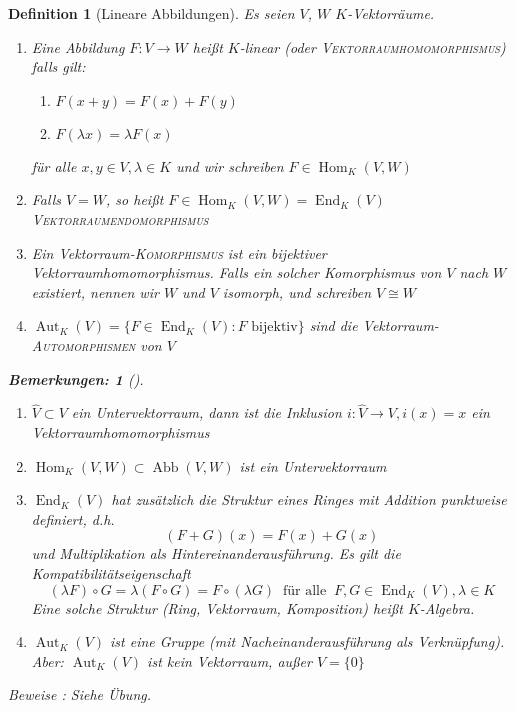 \documentclass{report}
\newcommand{\IN}[1]{\index{#1|BH}}
\newcommand{\lb}{\lambda}
\DeclareMathOperator{\abb}{Abb}
\DeclareMathOperator{\Hom}{Hom}
\DeclareMathOperator{\End}{End}
\DeclareMathOperator{\Aut}{Aut}
\theoremstyle{customrem}
\newtheorem*{bemerkung2}{Bemerkungen\textnormal:}
\newenvironment{bemerkungen}[1][]{\begin{bemerkung2}[#1]\leavevmode}{\end{bemerkung2}}
\theoremstyle{customdef}
\newtheorem{definition}{Definition}[chapter]
\newcommand{\defemph}[1]{\textsc{#1}}
\begin{document}
	\begin{definition}[Lineare Abbildungen]
		\label{def31}
		\IN{Lineare Abbildung}
		Es seien \(V\), \(W\) \(K\)-Vektorräume.
		\begin{enumerate}
			\item Eine Abbildung \(F : V \to W\) heißt \(K\)-linear (oder \defemph{Vektorraumhomomorphismus}) falls gilt:
			\begin{enumerate}[leftmargin=5cm]
				\item \(F(x + y) = F(x) + F(y)\)
				\item \(F(\lb x) = \lb F(x)\)
			\end{enumerate}
			für alle \(x, y \in V, \lb \in K\) und wir schreiben \(F \in \Hom_K(V, W)\)
			
			\item Falls \(V = W\), so heißt \(F \in \Hom_K(V, W) = \End_K(V)\) \defemph{Vektorraumendomorphismus}
			\item Ein Vektorraum-\defemph{Komorphismus} ist ein bijektiver Vektorraumhomomorphismus. Falls ein solcher Komorphismus von \(V\) nach \(W\) existiert, nennen wir \(W\) und \(V\) isomorph, und schreiben \(V \cong W\)
			\item \(\Aut_K(V) = \{F \in \End_K(V) : F \text{ bijektiv}\}\) sind die Vektorraum-\defemph{Automorphismen} von \(V\)
		\end{enumerate}
		\vspace{.1cm}
		\begin{bemerkungen}
			\begin{enumerate}
				\item \(\hat{V} \subset V\) ein Untervektorraum, dann ist die Inklusion \(i : \hat{V} \to V, i(x) = x\) ein Vektorraumhomomorphismus
				\item \(\Hom_K(V, W) \subset \abb(V, W)\) ist ein Untervektorraum
				\item \(\End_K(V)\) hat zusätzlich die Struktur eines Ringes mit Addition punktweise definiert, d.h. \[(F + G)(x) = F(x) + G(x)\] und Multiplikation als Hintereinanderausführung.
				Es gilt die Kompatibilitätseigenschaft
				\[(\lb F) \circ G = \lb (F \circ G) = F \circ (\lb G)\ \text{ für alle }\ F, G \in \End_K(V), \lb \in K\]
				Eine solche Struktur (Ring, Vektorraum, Komposition) heißt \(K\)-Algebra.
				
				\item \(\Aut_K(V)\) ist eine Gruppe (mit Nacheinanderausführung als Verknüpfung). Aber: \(\Aut_K(V)\) ist kein Vektorraum, außer \(V = \{0\}\)
			\end{enumerate}
		\end{bemerkungen}
		Beweise : Siehe Übung.\\
		

\end{definition}
\end{document}
